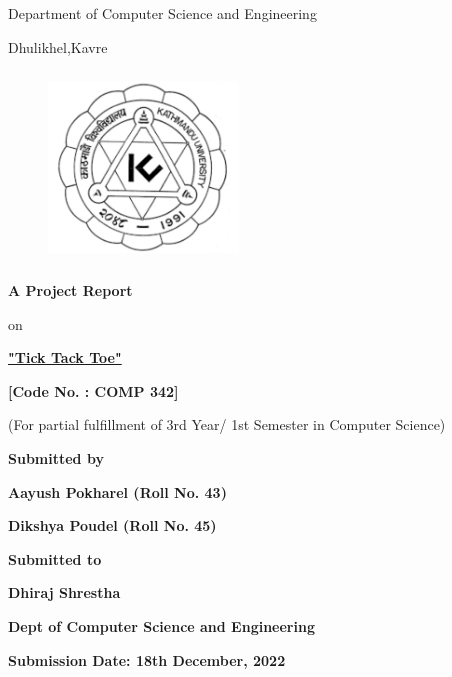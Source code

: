 \documentclass[12pt]{article}
\begin{document}
\thispagestyle{empty}

\section*{}
 {\LARGE{}}

\centerline{Department of Computer Science and Engineering}
\centerline{Dhulikhel,Kavre}
\begin{figure}[h]
    \centerline{\includegraphics[width=50.546mm,height=50.546mm]{KU_Logo.png}}
\end{figure}

\centerline{\textbf{A Project Report}}
\centerline{on}
\centerline{\underline{\textbf{"Tick Tack Toe"}}}

\vspace*{12mm}

\centerline{\textbf{[Code No. : COMP 342]}}
\centerline{(For partial fulfillment of 3rd Year/ 1st Semester in Computer Science)}

\vspace*{20mm}

\centerline{\textbf{Submitted by}}
\centerline{\textbf{Aayush Pokharel (Roll No. 43)}}
\centerline{\textbf{Dikshya Poudel (Roll No. 45)}}


\vspace*{26mm}


\centerline{\textbf{Submitted to}}
\centerline{\textbf{Dhiraj Shrestha}}
\centerline{\textbf{Dept of Computer Science and Engineering}}

\vspace*{20mm}

\centerline{\textbf{Submission Date: 18th December, 2022}}



\clearpage
\thispagestyle{empty}
\end{document}
